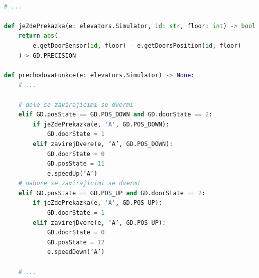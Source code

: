 \documentclass{fkssolpub}
\begin{document}
\begin{lstlisting}[language=Python]

# ...

def jeZdePrekazka(e: elevators.Simulator, id: str, floor: int) -> bool:
    return abs(
        e.getDoorSensor(id, floor) - e.getDoorsPosition(id, floor)
    ) > GD.PRECISION

def prechodovaFunkce(e: elevators.Simulator) -> None:
    # ...

    # dole se zavirajicimi se dvermi
    elif GD.posState == GD.POS_DOWN and GD.doorState == 2:
        if jeZdePrekazka(e, 'A', GD.POS_DOWN):
            GD.doorState = 1
        elif zavirejDvere(e, ’A’, GD.POS_DOWN):
            GD.doorState = 0
            GD.posState = 11
            e.speedUp(’A’)
    # nahore se zavirajicimi se dvermi
    elif GD.posState == GD.POS_UP and GD.doorState == 2:
        if jeZdePrekazka(e, 'A', GD.POS_UP):
            GD.doorState = 1
        elif zavirejDvere(e, ’A’, GD.POS_UP):
            GD.doorState = 0
            GD.posState = 12
            e.speedDown(’A’)

    # ...

\end{lstlisting}
\end{document}
